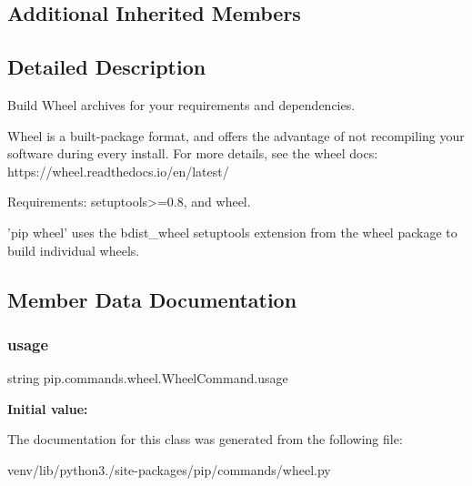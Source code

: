 \subsection*{Additional Inherited Members}


\subsection{Detailed Description}
\begin{DoxyVerb}Build Wheel archives for your requirements and dependencies.

Wheel is a built-package format, and offers the advantage of not
recompiling your software during every install. For more details, see the
wheel docs: https://wheel.readthedocs.io/en/latest/

Requirements: setuptools>=0.8, and wheel.

'pip wheel' uses the bdist_wheel setuptools extension from the wheel
package to build individual wheels.\end{DoxyVerb}
 

\subsection{Member Data Documentation}
\mbox{\label{classpip_1_1commands_1_1wheel_1_1_wheel_command_ae27437b66402e740b325333f2b5cfb78}} 
\subsubsection{\texorpdfstring{usage}{usage}}
{\footnotesize\ttfamily string pip.\+commands.\+wheel.\+Wheel\+Command.\+usage\hspace{0.3cm}{\ttfamily [static]}}

{\bfseries Initial value\+:}
\begin{DoxyCode}
=  \textcolor{stringliteral}{"""}
\textcolor{stringliteral}{  %
\textcolor{stringliteral}{  %
\textcolor{stringliteral}{  %
\textcolor{stringliteral}{  %
\textcolor{stringliteral}{  %
\end{DoxyCode}


The documentation for this class was generated from the following file\+:\begin{DoxyCompactItemize}
\item 
venv/lib/python3./site-\/packages/pip/commands/wheel.\+py\end{DoxyCompactItemize}
